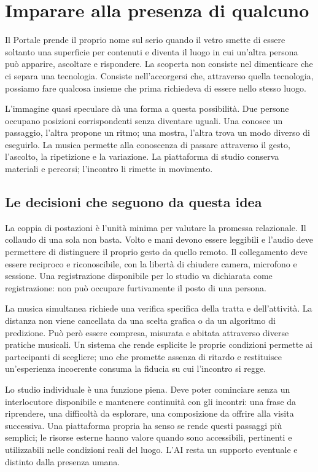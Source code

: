 \chapter{Imparare alla presenza di qualcuno}\label{ch:synthesis}

Il Portale prende il proprio nome sul serio quando il vetro smette di essere soltanto una superficie per contenuti e diventa il luogo in cui un'altra persona può apparire, ascoltare e rispondere. La scoperta non consiste nel dimenticare che ci separa una tecnologia. Consiste nell'accorgersi che, attraverso quella tecnologia, possiamo fare qualcosa insieme che prima richiedeva di essere nello stesso luogo.

L'immagine quasi speculare dà una forma a questa possibilità. Due persone occupano posizioni corrispondenti senza diventare uguali. Una conosce un passaggio, l'altra propone un ritmo; una mostra, l'altra trova un modo diverso di eseguirlo. La musica permette alla conoscenza di passare attraverso il gesto, l'ascolto, la ripetizione e la variazione. La piattaforma di studio conserva materiali e percorsi; l'incontro li rimette in movimento.

\section{Le decisioni che seguono da questa idea}
La coppia di postazioni è l'unità minima per valutare la promessa relazionale. Il collaudo di una sola non basta. Volto e mani devono essere leggibili e l'audio deve permettere di distinguere il proprio gesto da quello remoto. Il collegamento deve essere reciproco e riconoscibile, con la libertà di chiudere camera, microfono e sessione. Una registrazione disponibile per lo studio va dichiarata come registrazione: non può occupare furtivamente il posto di una persona.

La musica simultanea richiede una verifica specifica della tratta e dell'attività. La distanza non viene cancellata da una scelta grafica o da un algoritmo di predizione. Può però essere compresa, misurata e abitata attraverso diverse pratiche musicali. Un sistema che rende esplicite le proprie condizioni permette ai partecipanti di scegliere; uno che promette assenza di ritardo e restituisce un'esperienza incoerente consuma la fiducia su cui l'incontro si regge.

Lo studio individuale è una funzione piena. Deve poter cominciare senza un interlocutore disponibile e mantenere continuità con gli incontri: una frase da riprendere, una difficoltà da esplorare, una composizione da offrire alla visita successiva. Una piattaforma propria ha senso se rende questi passaggi più semplici; le risorse esterne hanno valore quando sono accessibili, pertinenti e utilizzabili nelle condizioni reali del luogo. L'AI resta un supporto eventuale e distinto dalla presenza umana.

